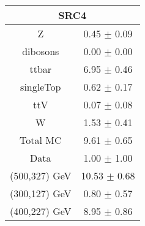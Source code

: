 \begin{tabular}{c|c}
\hline\hline
\multicolumn{2}{c}{\bf SRC4 } \\ \hline 
Z & 0.45 $\pm$ 0.09 \\
dibosons & 0.00 $\pm$ 0.00 \\
ttbar & 6.95 $\pm$ 0.46 \\
singleTop & 0.62 $\pm$ 0.17 \\
ttV & 0.07 $\pm$ 0.08 \\
W & 1.53 $\pm$ 0.41 \\
\hline
Total MC & 9.61 $\pm$ 0.65 \\
Data & 1.00 $\pm$ 1.00 \\
\hline
(500,327) GeV & 10.53 $\pm$ 0.68 \\
\hline
(300,127) GeV & 0.80 $\pm$ 0.57  \\
\hline
 (400,227) GeV & 8.95 $\pm$ 0.86 \\
\hline\hline
\end{tabular}
